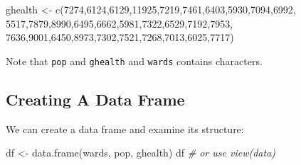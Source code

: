 \documentclass[
]{book}
\newenvironment{Shaded}{\begin{snugshade}}{\end{snugshade}}
\newcommand{\CommentTok}[1]{\textcolor[rgb]{0.56,0.35,0.01}{\textit{#1}}}
\newcommand{\DecValTok}[1]{\textcolor[rgb]{0.00,0.00,0.81}{#1}}
\newcommand{\FunctionTok}[1]{\textcolor[rgb]{0.00,0.00,0.00}{#1}}
\newcommand{\NormalTok}[1]{#1}
\newcommand{\OtherTok}[1]{\textcolor[rgb]{0.56,0.35,0.01}{#1}}
\begin{document}
\begin{Shaded}
\begin{Highlighting}[]
\NormalTok{ghealth }\OtherTok{\textless{}{-}} \FunctionTok{c}\NormalTok{(}\DecValTok{7274}\NormalTok{,}\DecValTok{6124}\NormalTok{,}\DecValTok{6129}\NormalTok{,}\DecValTok{11925}\NormalTok{,}\DecValTok{7219}\NormalTok{,}\DecValTok{7461}\NormalTok{,}\DecValTok{6403}\NormalTok{,}\DecValTok{5930}\NormalTok{,}\DecValTok{7094}\NormalTok{,}\DecValTok{6992}\NormalTok{,}
                 \DecValTok{5517}\NormalTok{,}\DecValTok{7879}\NormalTok{,}\DecValTok{8990}\NormalTok{,}\DecValTok{6495}\NormalTok{,}\DecValTok{6662}\NormalTok{,}\DecValTok{5981}\NormalTok{,}\DecValTok{7322}\NormalTok{,}\DecValTok{6529}\NormalTok{,}\DecValTok{7192}\NormalTok{,}\DecValTok{7953}\NormalTok{,}
                 \DecValTok{7636}\NormalTok{,}\DecValTok{9001}\NormalTok{,}\DecValTok{6450}\NormalTok{,}\DecValTok{8973}\NormalTok{,}\DecValTok{7302}\NormalTok{,}\DecValTok{7521}\NormalTok{,}\DecValTok{7268}\NormalTok{,}\DecValTok{7013}\NormalTok{,}\DecValTok{6025}\NormalTok{,}\DecValTok{7717}\NormalTok{)}
\end{Highlighting}
\end{Shaded}

Note that \texttt{pop} and \texttt{ghealth} and \texttt{wards} contains characters.

\hypertarget{creating-a-data-frame}{%
\subsection{Creating A Data Frame}\label{creating-a-data-frame}}

We can create a data frame and examine its structure:

\begin{Shaded}
\begin{Highlighting}[]
\NormalTok{df }\OtherTok{\textless{}{-}} \FunctionTok{data.frame}\NormalTok{(wards, pop, ghealth)}
\NormalTok{df }\CommentTok{\# or use view(data)}
\end{Highlighting}
\end{Shaded}
\end{document}
